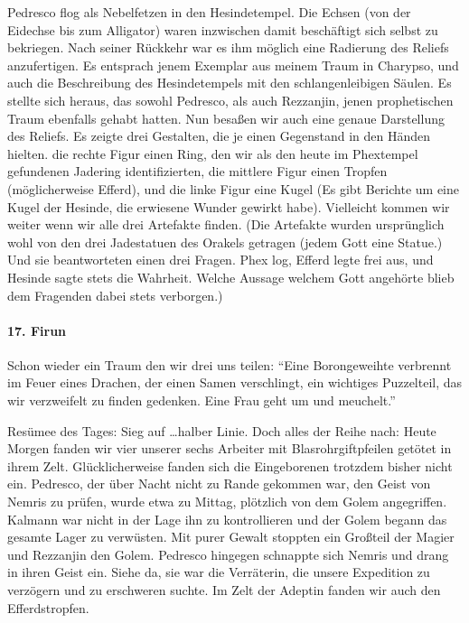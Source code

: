 Pedresco flog als Nebelfetzen in den Hesindetempel. Die Echsen (von der Eidechse bis zum Alligator) waren inzwischen damit beschäftigt sich selbst zu bekriegen. Nach seiner Rückkehr war es ihm möglich eine Radierung des Reliefs anzufertigen. Es entsprach jenem Exemplar aus meinem Traum in Charypso, und auch die Beschreibung des Hesindetempels mit den schlangenleibigen Säulen. Es stellte sich heraus, das sowohl Pedresco, als auch Rezzanjin, jenen prophetischen Traum ebenfalls gehabt hatten. Nun besaßen wir auch eine genaue Darstellung des Reliefs. Es zeigte drei Gestalten, die je einen Gegenstand in den Händen hielten. die rechte Figur einen Ring, den wir als den heute im Phextempel gefundenen Jadering identifizierten, die mittlere Figur einen Tropfen (möglicherweise Efferd), und die linke Figur eine Kugel (Es gibt Berichte um eine Kugel der Hesinde, die erwiesene Wunder gewirkt habe). Vielleicht kommen wir weiter wenn wir alle drei Artefakte finden. (Die Artefakte wurden ursprünglich wohl von den drei Jadestatuen des Orakels getragen (jedem Gott eine Statue.) Und sie beantworteten einen drei Fragen. Phex log, Efferd legte frei aus, und Hesinde sagte stets die Wahrheit. Welche Aussage welchem Gott angehörte blieb dem Fragenden dabei stets verborgen.)

\paragraph{17. Firun}
Schon wieder ein Traum den wir drei uns teilen: ``Eine Borongeweihte verbrennt im Feuer eines Drachen, der einen Samen verschlingt, ein wichtiges Puzzelteil, das wir verzweifelt zu finden gedenken. Eine Frau geht um und meuchelt.''

Resümee des Tages: Sieg auf \dots halber Linie. Doch alles der Reihe nach:
Heute Morgen fanden wir vier unserer sechs Arbeiter mit Blasrohrgiftpfeilen getötet in ihrem Zelt. Glücklicherweise fanden sich die Eingeborenen trotzdem bisher nicht ein.
Pedresco, der über Nacht nicht zu Rande gekommen war, den Geist von Nemris zu prüfen, wurde etwa zu Mittag, plötzlich von dem Golem angegriffen. Kalmann war nicht in der Lage ihn zu kontrollieren und der Golem begann das gesamte Lager zu verwüsten. Mit purer Gewalt stoppten ein Großteil der Magier und Rezzanjin den Golem. Pedresco hingegen schnappte sich Nemris und drang in ihren Geist ein. Siehe da, sie war die Verräterin, die unsere Expedition zu verzögern und zu erschweren suchte. Im Zelt der Adeptin fanden wir auch den Efferdstropfen.

